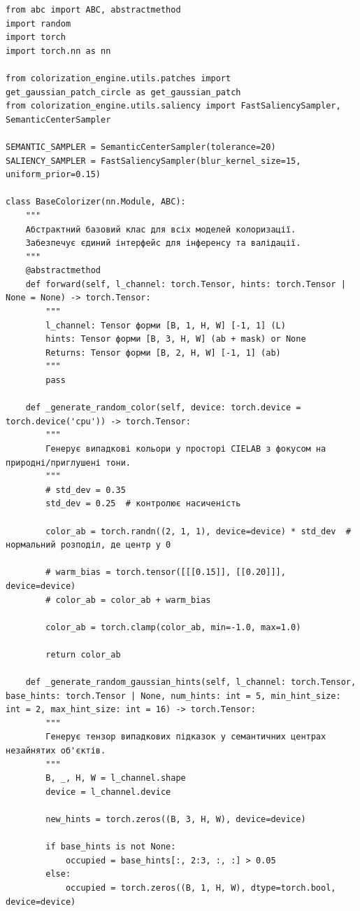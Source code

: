 \begin{lstlisting}[caption={Методи стохастичної генерації варіантів колоризації}]
from abc import ABC, abstractmethod
import random
import torch
import torch.nn as nn

from colorization_engine.utils.patches import get_gaussian_patch_circle as get_gaussian_patch
from colorization_engine.utils.saliency import FastSaliencySampler, SemanticCenterSampler

SEMANTIC_SAMPLER = SemanticCenterSampler(tolerance=20)
SALIENCY_SAMPLER = FastSaliencySampler(blur_kernel_size=15, uniform_prior=0.15)

class BaseColorizer(nn.Module, ABC):
    """
    Абстрактний базовий клас для всіх моделей колоризації.
    Забезпечує єдиний інтерфейс для інференсу та валідації.
    """
    @abstractmethod
    def forward(self, l_channel: torch.Tensor, hints: torch.Tensor | None = None) -> torch.Tensor:
        """
        l_channel: Tensor форми [B, 1, H, W] [-1, 1] (L)
        hints: Tensor форми [B, 3, H, W] (ab + mask) or None
        Returns: Tensor форми [B, 2, H, W] [-1, 1] (ab)
        """
        pass

    def _generate_random_color(self, device: torch.device = torch.device('cpu')) -> torch.Tensor:
        """
        Генерує випадкові кольори у просторі CIELAB з фокусом на природні/приглушені тони.
        """
        # std_dev = 0.35 
        std_dev = 0.25  # контролює насиченість

        color_ab = torch.randn((2, 1, 1), device=device) * std_dev  # нормальний розподіл, де центр у 0

        # warm_bias = torch.tensor([[[0.15]], [[0.20]]], device=device)
        # color_ab = color_ab + warm_bias

        color_ab = torch.clamp(color_ab, min=-1.0, max=1.0)

        return color_ab

    def _generate_random_gaussian_hints(self, l_channel: torch.Tensor, base_hints: torch.Tensor | None, num_hints: int = 5, min_hint_size: int = 2, max_hint_size: int = 16) -> torch.Tensor:
        """
        Генерує тензор випадкових підказок у семантичних центрах незайнятих об'єктів.
        """
        B, _, H, W = l_channel.shape
        device = l_channel.device

        new_hints = torch.zeros((B, 3, H, W), device=device)

        if base_hints is not None:
            occupied = base_hints[:, 2:3, :, :] > 0.05 
        else:
            occupied = torch.zeros((B, 1, H, W), dtype=torch.bool, device=device)


\end{lstlisting}
